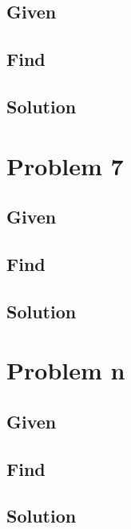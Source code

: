 \documentclass[a4paper,10pt]{article}
\begin{document}
\subsection{Given}
\subsection{Find}
\subsection{Solution}

\newpage
\section{Problem 7}
\subsection{Given}
\subsection{Find}
\subsection{Solution}


\newpage
\section{Problem n}
\subsection{Given}
\subsection{Find}
\subsection{Solution}
\end{document}
